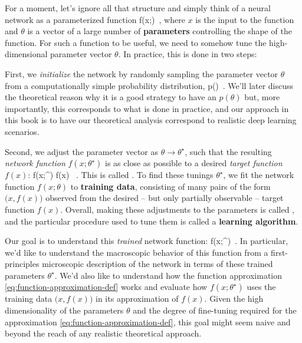 For a moment, let's ignore all that structure and simply think of a neural network as a parameterized function
\be
f(x;\theta)\, ,
\ee
where $x$ is the input to the function and $\theta$ is a vector of a large number of \textbf{parameters} controlling the shape of the function. 
For such a function to be useful,
we need to somehow tune the high-dimensional parameter vector $\theta$.
In practice, this is done in two steps: 
\bi
\item First, we \emph{initialize} the network by randomly sampling the parameter vector $\theta$ from a computationally simple probability distribution,
\be\label{eq:schematic-initialization}
p(\theta)\, .
\ee
We'll later discuss the theoretical reason why it is a good strategy to have an  $p(\theta)$ but, more importantly, this corresponds to what is done in practice, and our approach in this book is to have our theoretical analysis correspond to realistic deep learning scenarios.
\item Second, we adjust the parameter vector as $\theta \to \theta^\star$, such that the resulting \emph{network function} $f(x;\theta^\star)$ is as close as possible to a desired
\emph{target function} $f(x)$: 
\be\label{eq:function-approximation-def}
f(x;\theta^\star) \approx f(x) \, .
\ee
This is called .
To find these tunings $\theta^\star$, we 
fit the network function $f(x;\theta)$ to \textbf{training data}, consisting of many pairs of the form $\big(x, f(x)\big)$ observed from the desired -- but only partially observable -- target function $f(x)$. Overall, making these adjustments to the parameters is called , and the particular procedure used to tune them is called a \textbf{learning algorithm}.
\ei








Our goal is to understand this \emph{trained} network function:
\be\label{eq:lofty-goal}
f(x;\theta^\star)\, .
\ee
In particular, we'd like to understand the macroscopic behavior of this function
from a first-principles microscopic description of the network in terms of these trained parameters $\theta^\star$. We'd also like to understand how the function approximation \eqref{eq:function-approximation-def} works and evaluate how $f(x;\theta^\star)$ uses the training data $\big(x, f(x)\big)$ in its approximation of $f(x)$.
Given the high dimensionality of the parameters $\theta$ and the degree of fine-tuning required for the approximation \eqref{eq:function-approximation-def}, this goal might seem naive and beyond the reach of any realistic theoretical approach. 

